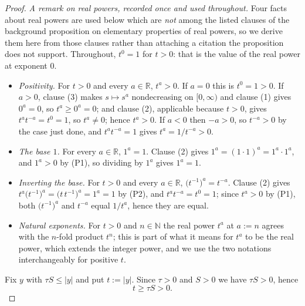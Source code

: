 \begin{proof}
\medskip\noindent\emph{A remark on real powers, recorded once and used throughout.}  Four facts
about real powers are used below which are \emph{not} among the listed clauses of the background
proposition on elementary properties of real powers, so we derive them here from those clauses
rather than attaching a citation the proposition does not support.  Throughout, $t^{0}=1$ for
$t>0$: that is the value of the real power at exponent $0$.
\begin{itemize}
\item[(P1)] \emph{Positivity.}  For $t>0$ and every $a\in\mathbb{R}$, $t^{a}>0$.  If $a=0$ this
is $t^{0}=1>0$.  If $a>0$, clause (3) makes $s\mapsto s^{a}$ nondecreasing on $[0,\infty)$ and
clause (1) gives $0^{a}=0$, so $t^{a}\ge0^{a}=0$; and clause (2), applicable because $t>0$,
gives $t^{a}t^{-a}=t^{0}=1$, so $t^{a}\ne0$; hence $t^{a}>0$.  If $a<0$ then $-a>0$, so
$t^{-a}>0$ by the case just done, and $t^{a}t^{-a}=1$ gives $t^{a}=1/t^{-a}>0$.
\item[(P2)] \emph{The base $1$.}  For every $a\in\mathbb{R}$, $1^{a}=1$.  Clause (2) gives
$1^{a}=(1\cdot1)^{a}=1^{a}\cdot1^{a}$, and $1^{a}>0$ by (P1), so dividing by $1^{a}$ gives
$1^{a}=1$.
\item[(P3)] \emph{Inverting the base.}  For $t>0$ and every $a\in\mathbb{R}$,
$\bigl(t^{-1}\bigr)^{a}=t^{-a}$.  Clause (2) gives
$t^{a}\bigl(t^{-1}\bigr)^{a}=\bigl(t\,t^{-1}\bigr)^{a}=1^{a}=1$ by (P2), and
$t^{a}t^{-a}=t^{0}=1$; since $t^{a}>0$ by (P1), both $\bigl(t^{-1}\bigr)^{a}$ and $t^{-a}$
equal $1/t^{a}$, hence they are equal.
\item[(P4)] \emph{Natural exponents.}  For $t>0$ and $n\in\mathbb{N}$ the real power $t^{a}$ at
$a:=n$ agrees with the $n$-fold product $t^{n}$; this is part of what it means for $t^{a}$ to be
the real power, which extends the integer power, and we use the two notations interchangeably
for positive $t$.
\end{itemize}

Fix $y$ with $\tau S\le\lvert y\rvert$ and put $t:=\lvert y\rvert$.  Since $\tau>0$ and $S>0$ we
have $\tau S>0$, hence
\begin{equation}\label{eq:tpfb-tpos}
  t\ge\tau S>0 .
\end{equation}


\end{proof}
